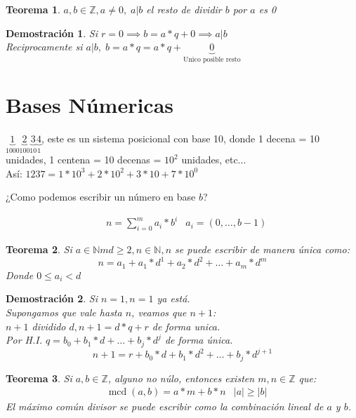 \documentclass[9pt,a4paper,draft]{article}
\theoremstyle{definition}
\theoremstyle{plain}
\newtheorem{teo}{Teorema}
\newtheorem{demo}{Demostración}[teo]
\DeclareMathOperator{\mcd}{mcd}
\begin{document}
\begin{teo} $a,b\in{\mathbb{Z}}, a\neq{0},\; a|b$ el resto de dividir $b$ por $a$ es 0\end{teo}
\begin{demo} 
Si $r=0 \implies b=a*q+0 \implies a|b$ \\
Reciprocamente si $a|b,\; b=a*q=a*q+\underbrace{0}_\text{Unico posible resto}$
\end{demo}

\section{Bases Númericas}

$\underbrace{1}_{1000}\underbrace{2}_{100}\underbrace{3}_{10}\underbrace{4}_{1}$, este es un sistema posicional con base 10, donde 1 decena = 10 unidades, 1 centena = 10 decenas = $10^2$ unidades, etc...\\

Así: $1237 = 1*10^3+2*10^2+3*10+7*10^0$

¿Como podemos escribir un número en base $b$?

\begin{align*} & n=\displaystyle\sum_{i=0}^{m}a_i*b^i & a_i=(0, \dots, b-1)\end{align*}

\begin{teo} Si $a\in{\mathbb{N}}m d\geq2, n\in{\mathbb{N}}, n$ se puede escribir de manera única como:
$$n = a_1 + a_1*d^1 + a_2*d^2 + \dots + a_m*d^m$$
Donde $0\leq{a_i}<d$
\end{teo}
\begin{demo}
Si $n=1, n=1$ ya está.\\
Supongamos que vale hasta $n$, veamos que $n+1$:\\
$n+1$ dividido $d, n+1=d*q+r$ de forma unica.\\
Por H.I. $q=b_0+b_1*d+\dots+b_j*d^j$ de forma única.\\
$$n+1 = r + b_0*d + b_1*d^2 + \dots + b_j*d^{j+1}$$
\end{demo}

\begin{teo} \label{teoeuclides} Si $a,b\in{\mathbb{Z}}$, alguno no núlo, entonces existen $m,n\in{\mathbb{Z}}$ que:\\
\begin{align*} & \mcd(a,b) = a*m+b*n & |a|\geq|b| \end{align*}
El máximo común divisor se puede escribir como la combinación lineal de $a$ y $b$.
\end{teo}
\end{document}
